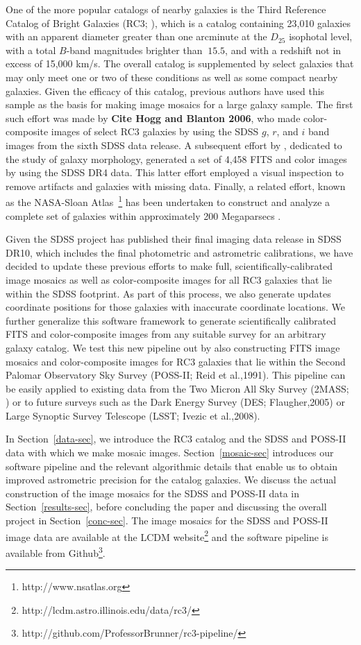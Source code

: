 \documentclass[authoryear, 12pt,5p, times]{elsarticle}
\begin{document}
One of the more popular catalogs of nearby galaxies is the Third Reference Catalog of Bright Galaxies (RC3; \citealp{rc31991}), which is a catalog containing 23,010 galaxies with an apparent diameter greater than one arcminute at the $D_{25}$ isophotal level, with a total $B$-band magnitudes brighter than $~15.5$, and with a redshift not in excess of 15,000 km/s. The overall catalog is supplemented by select galaxies that may only meet one or two of these conditions as well as some compact nearby galaxies. Given the efficacy of this catalog, previous authors have used this sample as the basis for making image mosaics for a large galaxy sample. The first such effort was made by \textbf{Cite Hogg and Blanton 2006}, who made color-composite images of select RC3 galaxies by using the SDSS $g$, $r$, and $i$ band images from the sixth SDSS data release. A subsequent effort by \citet{efigi}, dedicated to the study of galaxy morphology, generated a set of 4,458 FITS and color images by using the SDSS DR4 data. This latter effort employed a visual inspection to remove artifacts and galaxies with missing data. Finally, a related effort, known as the NASA-Sloan Atlas~\footnote{http://www.nsatlas.org} has been undertaken to construct and analyze a complete set of galaxies within approximately 200 Megaparsecs \cite{nsa}.

Given the SDSS project has published their final imaging data release in SDSS DR10, which includes the final photometric and astrometric calibrations, we have decided to update these previous efforts to make full, scientifically-calibrated image mosaics as well as color-composite images for all RC3 galaxies that lie within the SDSS footprint. As part of this process, we also generate updates coordinate positions for those galaxies with inaccurate coordinate locations. We further generalize this software framework to generate scientifically calibrated FITS and color-composite images from any suitable survey for an arbitrary galaxy catalog. We test this new pipeline out by also constructing FITS image mosaics and color-composite images for RC3 galaxies that lie within the Second Palomar Observatory Sky Survey (POSS-II; Reid et al.,1991). This pipeline can be easily applied to existing data from the Two Micron All Sky Survey (2MASS; \citealp{2mass}) or to future surveys such as the Dark Energy Survey (DES; Flaugher,2005) or Large Synoptic Survey Telescope (LSST; Ivezic et al.,2008).

In Section~\ref{data-sec}, we introduce the RC3 catalog and the SDSS and POSS-II data with which we make mosaic images. Section~\ref{mosaic-sec} introduces our software pipeline and the relevant algorithmic details that enable us to obtain improved astrometric precision for the catalog galaxies. We discuss the actual construction of the image mosaics for the SDSS and POSS-II data in Section~\ref{results-sec}, before concluding the paper and discussing the overall project in Section~\ref{conc-sec}. The image mosaics for the SDSS and POSS-II image data are available at the LCDM website\footnote{http://lcdm.astro.illinois.edu/data/rc3/} and the software pipeline is available from Github\footnote{http://github.com/ProfessorBrunner/rc3-pipeline/}.
\end{document}

